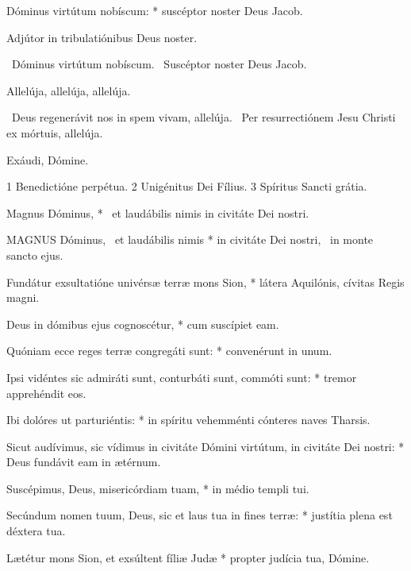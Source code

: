 Dóminus virtútum nobíscum: * suscéptor noster Deus Jacob.

 Adjútor in tribulatiónibus Deus noster.



\V\ Dóminus virtútum nobíscum. \R\ Suscéptor noster Deus Jacob.



 Allelúja, allelúja, allelúja.

\V\ Deus regenerávit nos in spem vivam, allelúja. \R\ Per resurrectiónem Jesu Christi ex mórtuis, allelúja.

 Exáudi, Dómine.

 1 Benedictióne perpétua. 2 Unigénitus Dei Fílius. 3 Spíritus Sancti grátia.



 Magnus Dóminus, * \textdagger\ et laudábilis nimis in civitáte Dei nostri. \textdaggerdbl


\lettrine[lines=2]{M}{AGNUS} Dóminus, \textdagger\ et laudábilis nimis * in civitáte Dei nostri, \textdaggerdbl\ in monte sancto ejus.

Fundátur exsultatióne univérsæ terræ mons Sion, * látera Aquilónis, cívitas Regis magni.

Deus in dómibus ejus cognoscétur, * cum suscípiet eam.

Quóniam ecce reges terræ congregáti sunt: * convenérunt in unum.

Ipsi vidéntes sic admiráti sunt, conturbáti sunt, commóti sunt: * tremor apprehéndit eos.

Ibi dolóres ut parturiéntis: * in spíritu vehemménti cónteres naves Tharsis.

Sicut audívimus, sic vídimus in civitáte Dómini virtútum, in civitáte Dei nostri: * Deus fundávit eam in ætérnum.

Suscépimus, Deus, misericórdiam tuam, * in médio templi tui.

Secúndum nomen tuum, Deus, sic et laus tua in fines terræ: * justítia plena est déxtera tua.

Lætétur mons Sion, et exsúltent fíliæ Judæ * propter judícia tua, Dómine.

